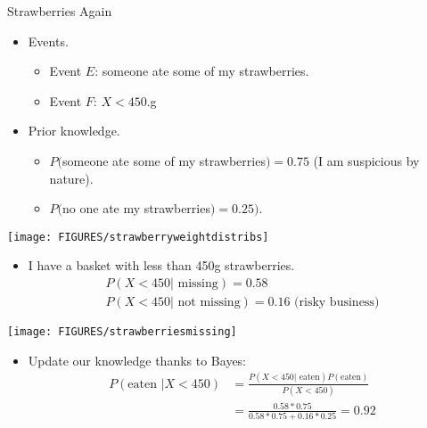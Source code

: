 \documentclass[9pt]{beamer}
\begin{document}
\begin{frame}[t]{Strawberries Again}
  \begin{itemize}
  \item Events.
    \begin{itemize}
    \item Event $E$: someone ate some of my strawberries.
    \item Event $F$: $X < 450$.g
    \end{itemize}
  \item Prior knowledge.
    \begin{itemize}
    \item $P($someone ate some of my strawberries$) = 0.75$ (I am suspicious by nature).
    \item $P($no one ate my strawberries$) = 0.25)$.
    \end{itemize}
  \end{itemize}
  \begin{center}
    \texttt{[image: FIGURES/strawberryweightdistribs]}  
  \end{center}
\end{frame}



\begin{frame}[t]
  \begin{itemize}
  \item I have a basket with less than 450g strawberries.
    \begin{align*}
    &P(X < 450 | \text{ missing}) = 0.58&\\
    &P(X < 450 | \text{ not missing}) = 0.16\,\, (\text{risky business)}&
  \end{align*}
\end{itemize}
\begin{center}
  \texttt{[image: FIGURES/strawberriesmissing]}
\end{center}
\begin{itemize}
\item Update our knowledge thanks to Bayes:
  \begin{align*}
    P(\text{eaten } | X < 450 ) &
    =\frac{P(X < 450 | \text{ eaten}) P(\text{eaten})}{P(X < 450)}\\
    &=\frac{0.58*0.75}{0.58*0.75 + 0.16*0.25} = 0.92
  \end{align*}
\end{itemize}
\end{frame}
\end{document}
